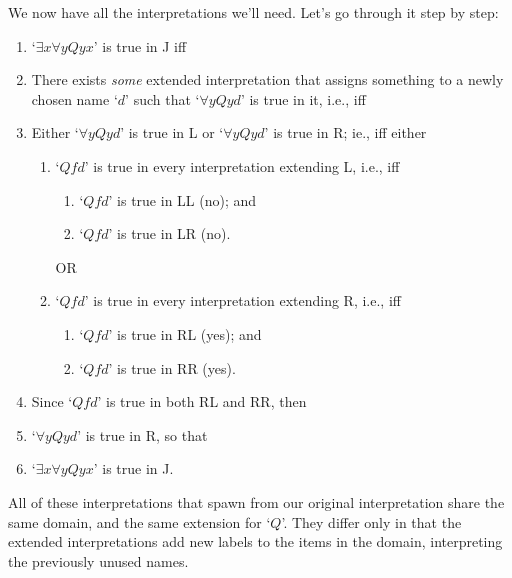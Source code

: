 \begin{earg}
We now have all the interpretations we'll need. Let's go through it step by step: \begin{enumerate}
	\item  `$\exists x \forall y Qyx$' is true in J iff 
	\item There exists \emph{some} extended interpretation that assigns something to a newly chosen name `$d$' such that `$\forall y Qyd$' is true in it, i.e., iff
	\item Either `$\forall y Qyd$' is true in L or `$\forall y Qyd$' is true in R; ie., iff either
 \begin{enumerate}
		\item `$Qfd$' is true in every interpretation extending L, i.e., iff \begin{enumerate}
			\item `$Qfd$' is true in LL (no); and
			\item `$Qfd$' is true in LR (no).
		\end{enumerate} OR
		\item  `$Qfd$' is true in every interpretation extending R, i.e., iff \begin{enumerate}
			\item `$Qfd$' is true in RL (yes); and
			\item `$Qfd$' is true in RR (yes).
		\end{enumerate}
	\end{enumerate}
	\item Since `$Qfd$' is true in both RL and RR, then
	\item `$\forall y Qyd$' is true in R, so that
	\item `$\exists x \forall y Qyx$' is true in J.
\end{enumerate}
All of these interpretations that spawn from our original interpretation share the same domain, and the same extension for `$Q$'. They differ only in that the extended interpretations add new labels to the items in the domain, interpreting the previously unused names. 


\end{earg}
